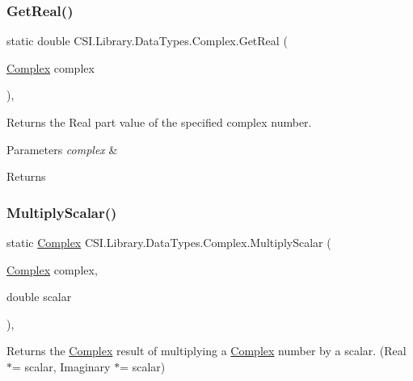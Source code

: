 \subsubsection{\texorpdfstring{GetReal()}{GetReal()}}
{\footnotesize\ttfamily static double C\+S\+I.\+Library.\+Data\+Types.\+Complex.\+Get\+Real (\begin{DoxyParamCaption}\item[{\mbox{\hyperlink{struct_c_s_i_1_1_library_1_1_data_types_1_1_complex}{Complex}}}]{complex }\end{DoxyParamCaption})\hspace{0.3cm}{\ttfamily [inline]}, {\ttfamily [static]}}



Returns the Real part value of the specified complex number. 


\begin{DoxyParams}{Parameters}
{\em complex} & \\
\hline
\end{DoxyParams}
\begin{DoxyReturn}{Returns}

\end{DoxyReturn}
\mbox{\label{struct_c_s_i_1_1_library_1_1_data_types_1_1_complex_a63bafff9c14f0c10a5b6042b3bd4116e}} 
\subsubsection{\texorpdfstring{MultiplyScalar()}{MultiplyScalar()}}
{\footnotesize\ttfamily static \mbox{\hyperlink{struct_c_s_i_1_1_library_1_1_data_types_1_1_complex}{Complex}} C\+S\+I.\+Library.\+Data\+Types.\+Complex.\+Multiply\+Scalar (\begin{DoxyParamCaption}\item[{\mbox{\hyperlink{struct_c_s_i_1_1_library_1_1_data_types_1_1_complex}{Complex}}}]{complex,  }\item[{double}]{scalar }\end{DoxyParamCaption})\hspace{0.3cm}{\ttfamily [inline]}, {\ttfamily [static]}}



Returns the \mbox{\hyperlink{struct_c_s_i_1_1_library_1_1_data_types_1_1_complex}{Complex}} result of multiplying a \mbox{\hyperlink{struct_c_s_i_1_1_library_1_1_data_types_1_1_complex}{Complex}} number by a scalar. (Real $\ast$= scalar, Imaginary $\ast$= scalar) 



